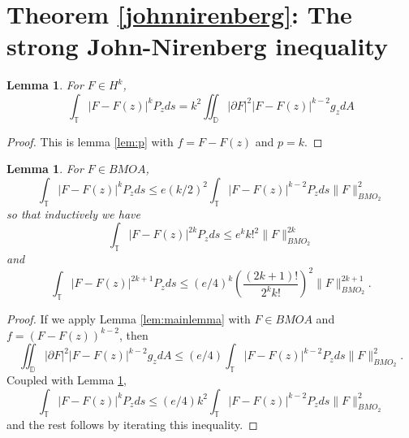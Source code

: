 \documentclass[12pt]{amsart}
\newtheorem{lemma}[theorem]{Lemma}
\theoremstyle{definition}
\theoremstyle{remark}
\numberwithin{equation}{section}
\newcommand{\D}{\mathbb{D}}
\newcommand{\T}{\mathbb{T}}
\begin{document}
\section{Theorem \ref{johnnirenberg}: The strong John-Nirenberg inequality}

\begin{lemma} \label{HS-k}
For $F\in H^k$,
\[
\int_{\T} |F-F(z)|^{k} P_zds =  k^2 \iint_{\D} |\partial F|^2
|F-F(z)|^{k-2} g_z dA
\]
\end{lemma}

\begin{proof}
This is lemma \ref{lem:p} with $f = F-F(z)$ and $p=k$.
\end{proof}

\begin{lemma} \label{inductlemma}
For $F \in BMOA$, 
\[
\int_{\T} |F-F(z)|^{k} P_zds \leq e (k/2)^2 \int_{\T} |F-F(z)|^{k-2} P_zds \| F\|_{BMO_2}^2
\]
so that inductively we have
\[
\int_{\T} |F-F(z)|^{2k} P_zds \leq e^k k!^2 \| F\|^{2k}_{BMO_2}
\]
and
\[
\int_{\T} |F-F(z)|^{2k+1} P_zds  
\leq (e/4)^k
\left(\frac{(2k+1)!}{2^kk!}\right)^2 \|F\|^{2k+1}_{BMO_2}. 
\]

\end{lemma}

\begin{proof}
If we apply Lemma \ref{lem:mainlemma} with $F \in BMOA$ and
$f=(F-F(z))^{k-2}$, then
\[
\iint_{\D} |\partial F|^2 |F-F(z)|^{k-2} g_zdA \leq (e/4) \int_{\T}
|F-F(z)|^{k-2} P_zds \| F\|_{BMO_2}^2.
\]
Coupled with Lemma \ref{HS-k},
\[
\int_{\T} |F-F(z)|^{k} P_z ds \leq (e/4) k^2 \int_{\T} |F-F(z)|^{k-2} P_z ds\| F\|_{BMO_2}^2
\]
and the rest follows by iterating this inequality. 
\end{proof}
\end{document}
